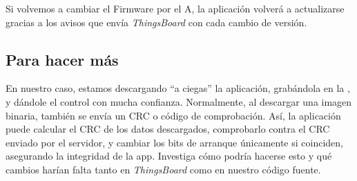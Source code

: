 \documentclass[../main.tex]{subfiles}
\begin{document}
            Si volvemos a cambiar el Firmware por el A, la aplicación volverá a actualizarse gracias a los avisos que envía \emph{ThingsBoard} con cada cambio de versión.

    \subsection{Para hacer más}

        En nuestro caso, estamos descargando ``a ciegas'' la aplicación, grabándola en la , y dándole el control con mucha confianza. Normalmente, al descargar una imagen binaria, también se envía un CRC o código de comprobación. Así, la aplicación puede calcular el CRC de los datos descargados, comprobarlo contra el CRC enviado por el servidor, y cambiar los bits de arranque únicamente si coinciden, asegurando la integridad de la app. Investiga cómo podría hacerse esto y qué cambios harían falta tanto en \emph{ThingsBoard} como en nuestro código fuente.
\end{document}
